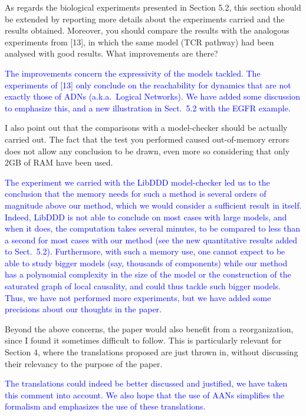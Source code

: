 \documentclass[11pt]{article}
\newcommand{\answer}[1]{\textcolor{blue}{#1}\vspace*{1em}}
\begin{document}
As regards the biological experiments presented in Section 5.2, this section should be extended by reporting more details about the experiments carried and the results obtained. Moreover, you should compare the results with the analogous experiments from [13], in which the same model (TCR pathway) had been analysed with good results. What improvements are there?

\answer{
The improvements concern the expressivity of the models tackled.
The experiments of [13] only conclude on the reachability for dynamics
that are not exactly those of ADNs (a.k.a.~Logical Networks).
We have added some discussion to emphasize this,
and a new illustration in Sect.~5.2 with the EGFR example.
}

I also point out that the comparisons with a model-checker should be actually carried out. The fact that the test you performed caused out-of-memory errors does not allow any conclusion to be drawn, even more so considering that only 2GB of RAM have been used.

\answer{
The experiment we carried with the LibDDD model-checker led us to the conclusion that the memory needs for such a method is several orders of magnitude above our method, which we would consider a sufficient result in itself.
Indeed, LibDDD is not able to conclude on most cases with large models,
and when it does, the computation takes several minutes,
to be compared to less than a second for most cases with our method
(see the new quantitative results added to Sect.~5.2).
Furthermore, with such a memory use, one cannot expect to be able to study bigger models (say, thousands of components) while our method has a polynomial complexity in the size of the model or the construction of the saturated graph of local causality, and could thus tackle such bigger models.
Thus, we have not performed more experiments,
but we have added some precisions about our thoughts in the paper.
}

Beyond the above concerns, the paper would also benefit from a reorganization, since I found it sometimes difficult to follow. This is particularly relevant for Section 4, where the translations proposed are just thrown in, without discussing their relevancy to the purpose of the paper.

\answer{
The translations could indeed be better discussed and justified,
we have taken this comment into account.
We also hope that the use of AANs simplifies the formalism
and emphasizes the use of these translations.
}
\end{document}

